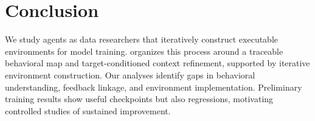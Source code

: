 \section{Conclusion}
\label{sec:conclusion}

We study agents as data researchers that iteratively construct executable
environments for model training. \method{} organizes this process around a
traceable behavioral map and target-conditioned context refinement, supported
by iterative environment construction. Our analyses identify gaps in behavioral
understanding, feedback linkage, and environment implementation. Preliminary
training results show useful checkpoints but also regressions, motivating
controlled studies of sustained improvement.
